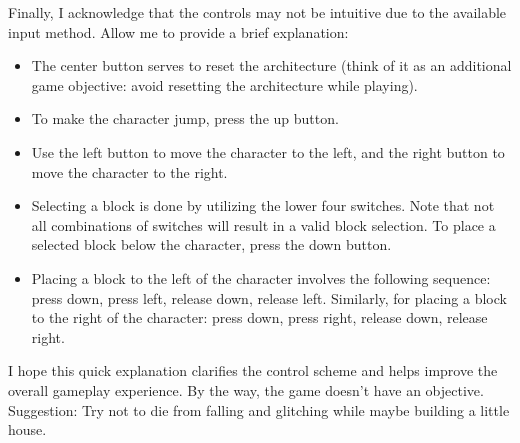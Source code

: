 \documentclass[12pt,a4paper]{article}
\begin{document}
Finally, I acknowledge that the controls may not be intuitive due to the
available input method. Allow me to provide a brief explanation:

\begin{itemize}
\item The center button serves to reset the architecture (think of it as an
additional game objective: avoid resetting the architecture while playing).

\item To make the character jump, press the up button.

\item Use the left button to move the character to the left, and the right
button to move the character to the right.

\item Selecting a block is done by utilizing the lower four switches. Note that
not all combinations of switches will result in a valid block selection.
To place a selected block below the character, press the down button.

\item Placing a block to the left of the character involves the following
sequence: press down, press left, release down, release left. Similarly, for
placing a block to the right of the character: press down, press right, release
down, release right.

\end{itemize}

I hope this quick explanation clarifies the control scheme and helps improve
the overall gameplay experience. By the way, the game doesn't have an objective. 
Suggestion: Try not to die from falling and glitching while maybe building a
little house. 
\end{document}

